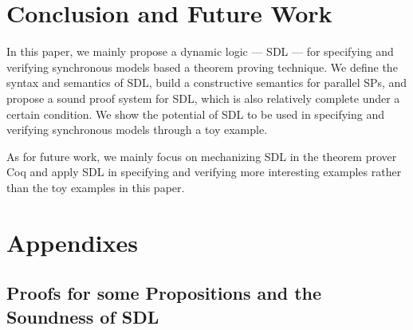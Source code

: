 \documentclass{fcs}
\begin{document}
\section{Conclusion and Future Work}
\label{section:Conclusion and Future Work}

In this paper, we mainly propose a dynamic logic --- SDL --- for specifying and verifying synchronous models based a theorem proving technique.
We define the syntax and semantics of SDL, build a constructive semantics for parallel SPs, and propose a sound proof system for SDL, which is also relatively complete under a certain condition.
We show the potential of SDL to be used in specifying and verifying synchronous models through a toy example.

As for future work, we mainly focus on mechanizing SDL in the theorem prover Coq and apply SDL in specifying and verifying more interesting examples rather than the toy examples in this paper.






%


\section{Appendixes}
\label{section:Appendixes}
\subsection{Proofs for some Propositions and the Soundness of SDL}
\label{section:Proofs for some Propositions and the Soundness of SDL}
\end{document}
